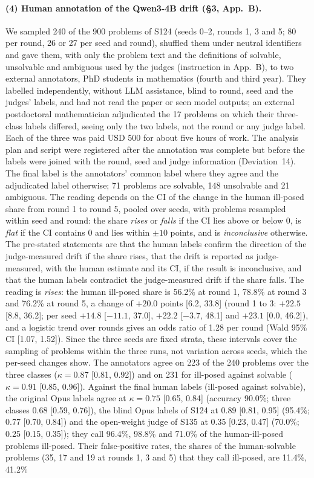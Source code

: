 \documentclass[10pt,a4paper]{article}
\begin{document}
\paragraph{(4) Human annotation of the Qwen3-4B drift (\S3, App.~B).} We sampled 240 of the 900 problems of S124 (seeds 0--2, rounds 1, 3 and 5; 80 per round, 26 or 27 per seed and round), shuffled them under neutral identifiers and gave them, with only the problem text and the definitions of solvable, unsolvable and ambiguous used by the judges (instruction in App.~B), to two external annotators, PhD students in mathematics (fourth and third year). They labelled independently, without LLM assistance, blind to round, seed and the judges' labels, and had not read the paper or seen model outputs; an external postdoctoral mathematician adjudicated the 17 problems on which their three-class labels differed, seeing only the two labels, not the round or any judge label. Each of the three was paid USD 500 for about five hours of work. The analysis plan and script were registered after the annotation was complete but before the labels were joined with the round, seed and judge information (Deviation~14). The final label is the annotators' common label where they agree and the adjudicated label otherwise; 71 problems are solvable, 148 unsolvable and 21 ambiguous. The reading depends on the CI of the change in the human ill-posed share from round 1 to round 5, pooled over seeds, with problems resampled within seed and round: the share \emph{rises} or \emph{falls} if the CI lies above or below 0, is \emph{flat} if the CI contains 0 and lies within $\pm 10$ points, and is \emph{inconclusive} otherwise. The pre-stated statements are that the human labels confirm the direction of the judge-measured drift if the share rises, that the drift is reported as judge-measured, with the human estimate and its CI, if the result is inconclusive, and that the human labels contradict the judge-measured drift if the share falls. The reading is \emph{rises}: the human ill-posed share is 56.2\% at round 1, 78.8\% at round 3 and 76.2\% at round 5, a change of $+20.0$ points [6.2, 33.8] (round 1 to 3: $+22.5$ [8.8, 36.2]; per seed $+14.8$ [$-11.1$, 37.0], $+22.2$ [$-3.7$, 48.1] and $+23.1$ [0.0, 46.2]), and a logistic trend over rounds gives an odds ratio of 1.28 per round (Wald 95\% CI [1.07, 1.52]). Since the three seeds are fixed strata, these intervals cover the sampling of problems within the three runs, not variation across seeds, which the per-seed changes show. The annotators agree on 223 of the 240 problems over the three classes ($\kappa = 0.87$ [0.81, 0.92]) and on 231 for ill-posed against solvable ($\kappa = 0.91$ [0.85, 0.96]). Against the final human labels (ill-posed against solvable), the original Opus labels agree at $\kappa = 0.75$ [0.65, 0.84] (accuracy 90.0\%; three classes 0.68 [0.59, 0.76]), the blind Opus labels of S124 at 0.89 [0.81, 0.95] (95.4\%; 0.77 [0.70, 0.84]) and the open-weight judge of S135 at 0.35 [0.23, 0.47] (70.0\%; 0.25 [0.15, 0.35]); they call 96.4\%, 98.8\% and 71.0\% of the human-ill-posed problems ill-posed. Their false-positive rates, the shares of the human-solvable problems (35, 17 and 19 at rounds 1, 3 and 5) that they call ill-posed, are 11.4\%, 41.2\% 
\end{document}
